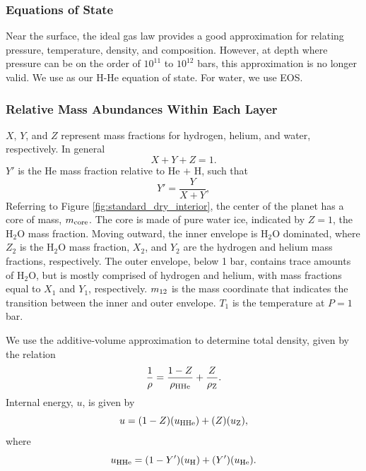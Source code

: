 \documentclass[11pt]{ucscthesisbs}
\begin{document}
\subsubsection{Equations of State}
Near the surface, the ideal gas law provides a good approximation for relating pressure, temperature, density, and composition. However, at depth where pressure can be on the order of $10^{11}$ to $10^{12}$ bars, this approximation is no longer valid. We use \citep{chabrier_eos} as our H-He equation of state. For water, we use \citep{mazevet_2019} EOS. 

\subsubsection{Relative Mass Abundances Within Each Layer}
$X$, $Y$, and $Z$ represent mass fractions for hydrogen, helium, and water, respectively. In general
\begin{equation}
  X + Y + Z = 1 .
\end{equation}
$Y'$ is the He mass fraction relative to He $+$ H, such that
\begin{equation}
  Y' = \frac{Y}{X+Y},
\end{equation}
Referring to Figure \ref{fig:standard_dry_interior}, the center of the planet has a core of mass, $m_{\rm core}$. The core is made of pure water ice, indicated by $Z = 1$, the H$_{2}$O mass fraction. Moving outward, the inner envelope is H$_{2}$O dominated, where $Z_{2}$ is the H$_{2}$O mass fraction, $X_{2}$, and $Y_{2}$ are the hydrogen and helium mass fractions, respectively. The outer envelope, below 1 bar, contains trace amounts of H$_{2}$O, but is mostly comprised of hydrogen and helium, with mass fractions equal to $X_{1}$ and $Y_{1}$, respectively. $m_{\rm 12}$ is the mass coordinate that indicates the transition between the inner and outer envelope. $T_{1}$ is the temperature at $P=1$ bar. 

We use the additive-volume approximation to determine total density, given by the relation
\begin{equation}
  \frac{1}{\rho} = \frac{1-Z}{\rho_{\rm H He}} + \frac{Z}{\rho_{\rm Z}}.
\end{equation}
Internal energy, $u$, is given by
\begin{equation}
  u = (1-Z)(u_{\rm HHe}) + (Z) (u_{\rm Z}),
\end{equation}
where
\begin{equation}
 u_{\rm HHe} = (1-Y')(u_{\rm H}) + (Y')(u_{\rm He}).
\end{equation}
\end{document}
